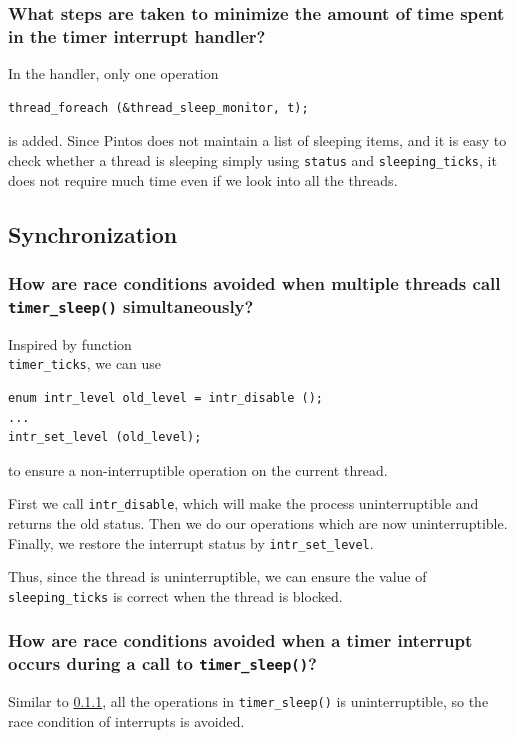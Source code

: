 \documentclass[sigconf, nonacm, balance=false, urlbreakonhyphens=true]{acmart}
\begin{document}
            \subsubsection{What steps are taken to minimize the amount of time spent in the timer interrupt handler? } \label{Minimize timer interrupt handler}
                In the handler, only one operation
                \begin{verbatim}
thread_foreach (&thread_sleep_monitor, t);
                \end{verbatim}
                is added. Since Pintos does not maintain a list of sleeping items, and it is easy to check whether a thread is sleeping simply using \texttt{status} and \texttt{sleeping\_ticks}, it does not require much time even if we look into all the threads. 
        
        \subsection{Synchronization}
        
            \subsubsection{How are race conditions avoided when multiple threads call \texttt{timer\_sleep()} simultaneously? } \label{Race Conditions of Threads}
                Inspired by function \\\texttt{timer\_ticks}, we can use 
            \begin{verbatim}
enum intr_level old_level = intr_disable ();
...
intr_set_level (old_level);
\end{verbatim}
                to ensure a non-interruptible operation on the current thread. 
                
                First we call \texttt{intr\_disable}, which will make the process uninterruptible and returns the old status. Then we do our operations which are now uninterruptible. Finally, we restore the interrupt status by \texttt{intr\_set\_level}. 

                Thus, since the thread is uninterruptible, we can ensure the value of \texttt{sleeping\_ticks} is correct when the thread is blocked. 
            
            \subsubsection{How are race conditions avoided when a timer interrupt occurs during a call to \texttt{timer\_sleep()}? }
                Similar to \ref{Race Conditions of Threads}, all the operations in \texttt{timer\_sleep()} is uninterruptible, so the race condition of interrupts is avoided. 
        
\end{document}
